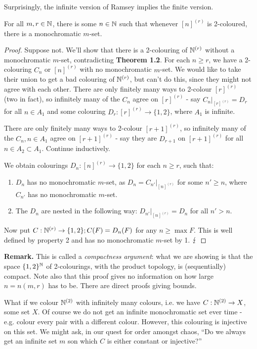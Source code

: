\documentclass[10pt,a4paper]{article}
\begin{document}
Surprisingly, the infinite version of Ramsey implies the finite version.
\begin{theorem}
  For all $m, r \in \mathbb{N}$, there is some $n \in \mathbb{N}$ such that whenever $[n]^{(r)}$ is 2-coloured, there is a monochromatic $m$-set.
\end{theorem}
\begin{proof}
  Suppose not. We'll show that there is a 2-colouring of $\mathbb{N}^{(r)}$ without a monochromatic $m$-set, contradicting \textbf{Theorem 1.2}. For each $n \geq r$, we have a 2-colouring $C_n$ or $[n]^{(r)}$ with no monochromatic $m$-set. We would like to take their union to get a bad colouring of $\mathbb{N}^{(r)}$, but can't do this, since they might not agree with each other. There are only finitely many ways to 2-colour $[r]^{(r)}$ (two in fact), so infinitely many of the $C_n$ agree on $[r]^{(r)}$ - say $C_n|_{[r]^{(r)}} = D_r$ for all $n \in A_1$ and some colouring $D_r: [r]^{(r)} \to \{1,2\}$, where $A_1$ is infinite.

  There are only finitely many ways to 2-colour $[r+1]^{(r)}$, so infinitely many of the $C_n, n \in A_1$ agree on $[r+1]^{(r)}$ - say they are $D_{r+1}$ on $[r+1]^{(r)}$ for all $n \in A_2 \subset A_1$. Continue inductively.

  We obtain colourings $D_n : [n]^{(r)}\to \{1,2\}$ for each $n \geq r$, such that:
  \begin{enumerate}
    \item $D_n$ has no monochromatic $m$-set, as $D_n = C_{n'}|_{[n]^{(r)}}$ for some $n' \geq n$, where $C_{n'}$ has no monochromatic $m$-set.
    \item The $D_n$ are nested in the following way: $D_{n'}|_{[n]^{(r)}} = D_n$ for all $n' > n$.
  \end{enumerate}
  Now put $C:\mathbb{N}^{(r)} \to \{1, 2\}; C(F) = D_n(F)$ for any $n \geq \max F$. This is well defined by property 2 and has no monochromatic $m$-set by 1. $\lightning$
\end{proof}

\textbf{Remark.} This is called a \emph{compactness argument}: what we are showing is that the space $\{1,2\}^{\mathbb{N}}$ of 2-colourings, with the product topology, is (sequentially) compact. Note also that this proof gives no information on how large $n = n(m,r)$ has to be. There are direct proofs giving bounds.

What if we colour $\mathbb{N}^{(2)}$ with infinitely many colours, i.e. we have $C: \mathbb{N}^{(2)} \to X$, some set $X$. Of course we do not get an infinite monochromatic set ever time - e.g. colour every pair with a different colour. However, this colouring is injective on this set. We might ask, in our quest for order amongst chaos, ``Do we always get an infinite set $m$ son which $C$ is either constant or injective?''
\end{document}
